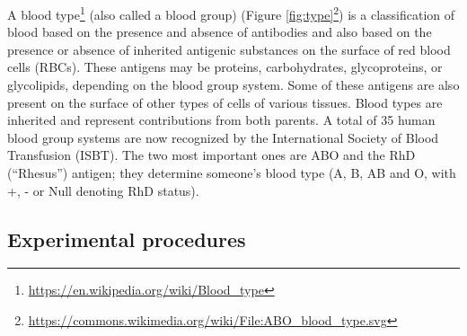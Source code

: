\documentclass[]{book}
\let\rmarkdownfootnote\footnote%
\def\footnote{\protect\rmarkdownfootnote}
\renewcommand{\href}[2]{#2\footnote{\url{#1}}}
\begin{document}
A \href{https://en.wikipedia.org/wiki/Blood_type}{blood type} (also called a blood group) (\href{https://commons.wikimedia.org/wiki/File:ABO_blood_type.svg}{Figure \ref{fig:type}}) is a classification of blood based on the presence and absence of antibodies and also based on the presence or absence of inherited antigenic substances on the surface of red blood cells (RBCs). These antigens may be proteins, carbohydrates, glycoproteins, or glycolipids, depending on the blood group system. Some of these antigens are also present on the surface of other types of cells of various tissues. Blood types are inherited and represent contributions from both parents. A total of 35 human blood group systems are now recognized by the International Society of Blood Transfusion (ISBT). The two most important ones are ABO and the RhD (``Rhesus'') antigen; they determine someone's blood type (A, B, AB and O, with +, - or Null denoting RhD status).

\hypertarget{experimental-procedures-31}{%
\subsection{Experimental procedures}\label{experimental-procedures-31}}
\end{document}
